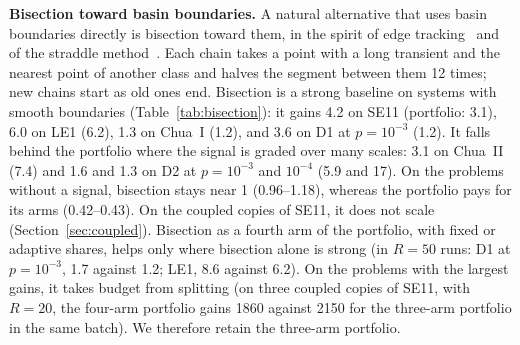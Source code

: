 

\textbf{Bisection toward basin boundaries.} A natural alternative that uses basin boundaries directly is bisection toward them, in the spirit of edge tracking~\cite{Skufca2006Edge,Schneider2007Edge} and of the straddle method~\cite{NusseYorke1989}. Each chain takes a point with a long transient and the nearest point of another class and halves the segment between them 12 times; new chains start as old ones end. Bisection is a strong baseline on systems with smooth boundaries (Table~\ref{tab:bisection}): it gains 4.2 on SE11 (portfolio: 3.1), 6.0 on LE1 (6.2), 1.3 on Chua~I (1.2), and 3.6 on D1 at $p=10^{-3}$ (1.2). It falls behind the portfolio where the signal is graded over many scales: 3.1 on Chua~II (7.4) and 1.6 and 1.3 on D2 at $p=10^{-3}$ and $10^{-4}$ (5.9 and 17). On the problems without a signal, bisection stays near 1 (0.96--1.18), whereas the portfolio pays for its arms (0.42--0.43). On the coupled copies of SE11, it does not scale (Section~\ref{sec:coupled}). Bisection as a fourth arm of the portfolio, with fixed or adaptive shares, helps only where bisection alone is strong (in $R=50$ runs: D1 at $p=10^{-3}$, 1.7 against 1.2; LE1, 8.6 against 6.2). On the problems with the largest gains, it takes budget from splitting (on three coupled copies of SE11, with $R=20$, the four-arm portfolio gains 1860 against 2150 for the three-arm portfolio in the same batch). We therefore retain the three-arm portfolio.

